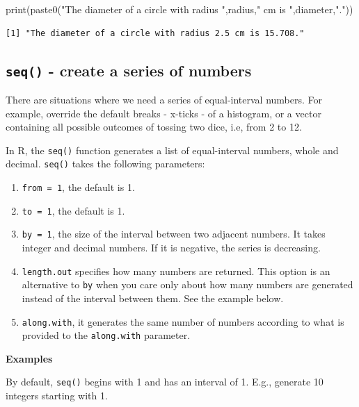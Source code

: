\documentclass[
  letterpaper,
  DIV=11,
  numbers=noendperiod]{scrreprt}
\newenvironment{Shaded}{\begin{snugshade}}{\end{snugshade}}
\newcommand{\FunctionTok}[1]{\textcolor[rgb]{0.28,0.35,0.67}{#1}}
\newcommand{\NormalTok}[1]{\textcolor[rgb]{0.00,0.23,0.31}{#1}}
\newcommand{\StringTok}[1]{\textcolor[rgb]{0.13,0.47,0.30}{#1}}
\begin{document}
\begin{Shaded}
\begin{Highlighting}[]
\FunctionTok{print}\NormalTok{(}\FunctionTok{paste0}\NormalTok{(}\StringTok{"The diameter of a circle with radius "}\NormalTok{,radius,}\StringTok{" cm is "}\NormalTok{,diameter,}\StringTok{"."}\NormalTok{))}
\end{Highlighting}
\end{Shaded}

\begin{verbatim}
[1] "The diameter of a circle with radius 2.5 cm is 15.708."
\end{verbatim}

\subsection{\texorpdfstring{\texttt{seq()} - create a series of
numbers}{seq() - create a series of numbers}}\label{sec-seq-function}

There are situations where we need a series of equal-interval numbers.
For example, override the default breaks - x-ticks - of a histogram, or
a vector containing all possible outcomes of tossing two dice, i.e, from
2 to 12.

In R, the \texttt{seq()} function generates a list of equal-interval
numbers, whole and decimal. \texttt{seq()} takes the following
parameters:

\begin{enumerate}
\def\labelenumi{\arabic{enumi}.}
\item
  \texttt{from\ =\ 1}, the default is 1.
\item
  \texttt{to\ =\ 1}, the default is 1.
\item
  \texttt{by\ =\ 1}, the size of the interval between two adjacent
  numbers. It takes integer and decimal numbers. If it is negative, the
  series is decreasing.
\item
  \texttt{length.out} specifies how many numbers are returned. This
  option is an alternative to \texttt{by} when you care only about how
  many numbers are generated instead of the interval between them. See
  the example below.
\item
  \texttt{along.with}, it generates the same number of numbers according
  to what is provided to the \texttt{along.with} parameter.
\end{enumerate}

\textbf{Examples}

By default, \texttt{seq()} begins with 1 and has an interval of 1. E.g.,
generate 10 integers starting with 1.
\end{document}
